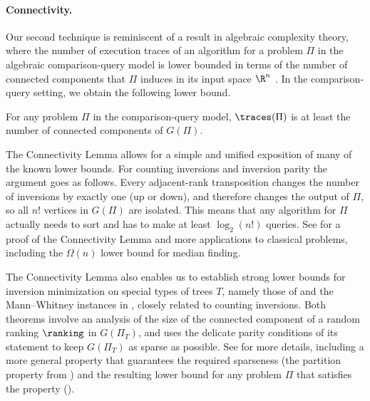 \documentclass{toc}
\begin{document}
\paragraph{Connectivity.} Our second technique is reminiscent of a result in algebraic complexity theory, where the number of execution traces of an algorithm for a problem $\Pi$ in the algebraic comparison-query model is lower bounded in terms of the number of connected components that $\Pi$ induces in its input space $\R^n$ \cite{Ben-Or1983}. In the comparison-query setting, we obtain the following lower bound.

\begin{lemma}\label{lemma:connectivity} For any problem $\Pi$ in the comparison-query model, $\traces(\Pi)$ is at least the number of connected components of $G(\Pi)$.
\end{lemma}

The Connectivity Lemma allows for a simple and unified exposition of many of the known lower bounds. For counting inversions and inversion parity the argument goes as follows. Every adjacent-rank transposition changes the number of inversions by exactly one (up or down), and therefore changes the output of $\Pi$, so all $n!$ vertices in $G(\Pi)$ are isolated. This means that any algorithm for $\Pi$ actually needs to sort and has to make at least $\log_2(n!)$ queries. See  for a proof of the Connectivity Lemma and more applications to classical problems, including the $\Omega(n)$ lower bound for median finding.

The Connectivity Lemma also enables us to establish strong lower bounds for inversion minimization on special types of trees $T$, namely those of  and the Mann--Whitney instances in , closely related to counting inversions. Both theorems involve an analysis of the size of the connected component of a random ranking $\ranking$ in $G(\Pi_T)$, and  uses the delicate parity conditions of its statement to keep $G(\Pi_T)$ as sparse as possible. See  for more details, including a more general property that guarantees the required sparseness (the partition property from ) and the resulting lower bound for any 
%
problem $\Pi$ that satisfies the property (). 
\end{document}
